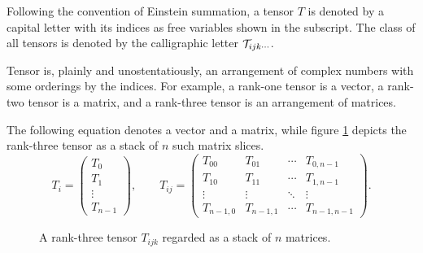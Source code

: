 Following the convention of Einstein summation, a tensor $T$ is denoted by a capital letter with its indices as free variables shown in the subscript.
The class of all tensors is denoted by the calligraphic letter $\mathcal{T}_{ijk \cdots}$.

Tensor is, plainly and unostentatiously, an arrangement of complex numbers with some orderings by the indices.
For example, a rank-one tensor is a vector, a rank-two tensor is a matrix, and a rank-three tensor is an arrangement of matrices.

The following equation denotes a vector and a matrix, while figure \ref{fig:rank3-stack} depicts the rank-three tensor as a stack of $n$ such matrix slices.
\begin{equation*}
	T_i =
	\begin{pmatrix}
		T_0 \\ T_1 \\ \vdots \\ T_{n-1}
	\end{pmatrix},
	\qquad
	T_{ij} =
	\begin{pmatrix}
		T_{00} & T_{01} & \cdots & T_{0,n-1} \\
		T_{10} & T_{11} & \cdots & T_{1,n-1} \\
		\vdots & \vdots & \ddots & \vdots \\
		T_{n-1,0} & T_{n-1,1} & \cdots & T_{n-1,n-1}
	\end{pmatrix}.
\end{equation*}

\begin{figure}[ht]
\centering

\caption{A rank-three tensor $T_{ijk}$ regarded as a stack of $n$ matrices.}
\label{fig:rank3-stack}
\end{figure}




